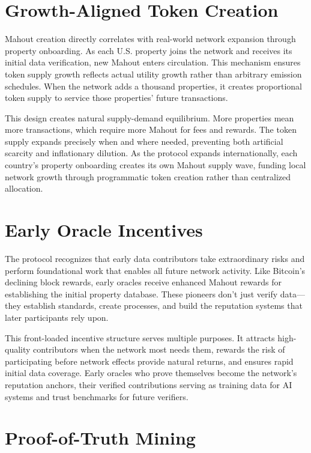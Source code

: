 \section{Growth-Aligned Token Creation}

Mahout creation directly correlates with real-world network expansion through property onboarding. As each U.S. property joins the network and receives its initial data verification, new Mahout enters circulation. This mechanism ensures token supply growth reflects actual utility growth rather than arbitrary emission schedules. When the network adds a thousand properties, it creates proportional token supply to service those properties' future transactions.

This design creates natural supply-demand equilibrium. More properties mean more transactions, which require more Mahout for fees and rewards. The token supply expands precisely when and where needed, preventing both artificial scarcity and inflationary dilution. As the protocol expands internationally, each country's property onboarding creates its own Mahout supply wave, funding local network growth through programmatic token creation rather than centralized allocation.

\section{Early Oracle Incentives}

The protocol recognizes that early data contributors take extraordinary risks and perform foundational work that enables all future network activity. Like Bitcoin's declining block rewards, early oracles receive enhanced Mahout rewards for establishing the initial property database. These pioneers don't just verify data---they establish standards, create processes, and build the reputation systems that later participants rely upon.

This front-loaded incentive structure serves multiple purposes. It attracts high-quality contributors when the network most needs them, rewards the risk of participating before network effects provide natural returns, and ensures rapid initial data coverage. Early oracles who prove themselves become the network's reputation anchors, their verified contributions serving as training data for AI systems and trust benchmarks for future verifiers.

\section{Proof-of-Truth Mining}

